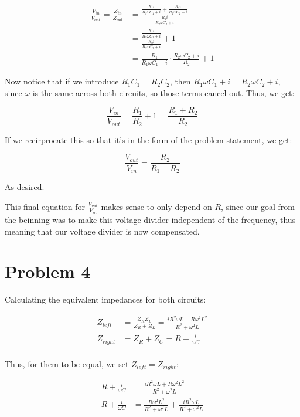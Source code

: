 \documentclass{article}
\theoremstyle{definition}
\numberwithin{equation}{section}
\numberwithin{definition}{section}
\begin{document}
\begin{align*}
    \frac{V_{in}}{V_{out}} = \frac{Z_{in}}{Z_{out}} &= \frac{\frac{R_1i}{R_1\omega C_1 + i} + \frac{R_2i}{R_2\omega C_2 +i}}{\frac{R_2i}{R_2\omega C_2 + i}}\\
    &= \frac{\frac{R_1i}{R_1\omega C_1 + i}}{\frac{R_2i}{R_2\omega C_2 + i}} + 1\\
    &= \frac{R_1}{R_1 \omega C_1 + i} \cdot \frac{R_2 \omega C_2 + i}{R_2} + 1 
\end{align*}

Now notice that if we introduce $R_1C_1 = R_2C_2$, then $R_1 \omega C_1 + i= R_2\omega C_2 + i$, since $\omega$ is the same across both circuits, so those terms cancel out. Thus, we get:

\[ \frac{V_{in}}{V_{out}} = \frac{R_1}{R_2} + 1 = \frac{R_1 + R_2}{R_2}\]

If we recirprocate this so that it's in the form of the problem statement, we get:

\[ \frac{V_{out}}{V_{in}} = \frac{R_2}{R_1 + R_2}\]

As desired. 

This final equation for $\frac{V_{out}}{V_{in}}$ makes sense to only depend on $R$, since our goal from the beinning was to make this voltage divider independent of the frequency, thus meaning that our voltage divider is now compensated.

\section{Problem 4}

Calculating the equivalent impedances for both circuits:

\begin{align*}
    Z_{left} &= \frac{Z_RZ_L}{Z_R + Z_L} = \frac{iR^2\omega L + R\omega^2 L^2}{R^2 + \omega^2 L}\\
    Z_{right} &= Z_R + Z_C = R + \frac{i}{\omega C}\\
\end{align*}

Thus, for them to be equal, we set $Z_{left} = Z_{right}$:

\begin{align*}
    R + \frac{i}{\omega C} &= \frac{iR^2\omega L + R\omega^2 L^2}{R^2 + \omega^2 L}\\
    R + \frac{i}{\omega C} &= \frac{R\omega^2L^2}{R^2 + \omega^2 L} + \frac{iR^2\omega L}{R^2 + \omega^2L}
\end{align*}
\end{document}
